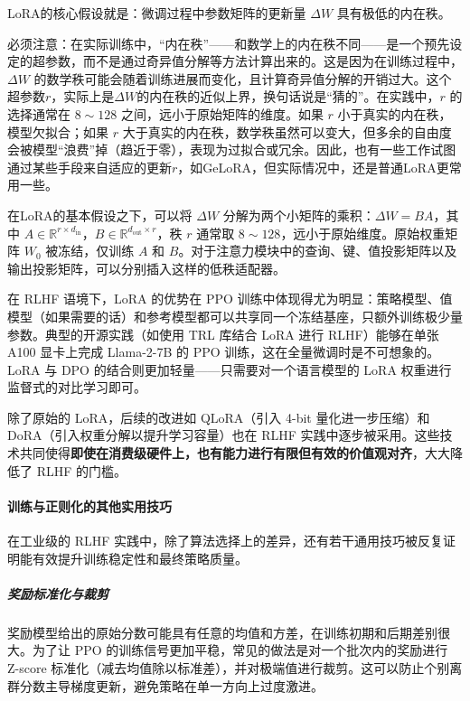 LoRA的核心假设就是：微调过程中参数矩阵的更新量 $\Delta W$ 具有极低的内在秩。

必须注意：在实际训练中，“内在秩”——和数学上的内在秩不同——是一个预先设定的超参数，而不是通过奇异值分解等方法计算出来的。这是因为在训练过程中，$\Delta W$ 的数学秩可能会随着训练进展而变化，且计算奇异值分解的开销过大。这个超参数$r$，实际上是$\Delta W$的内在秩的近似上界，换句话说是“猜的”。在实践中，$r$ 的选择通常在 $8\sim 128$ 之间，远小于原始矩阵的维度。如果 $r$ 小于真实的内在秩，模型欠拟合；如果 $r$ 大于真实的内在秩，数学秩虽然可以变大，但多余的自由度会被模型“浪费”掉（趋近于零），表现为过拟合或冗余。因此，也有一些工作试图通过某些手段来自适应的更新$r$，如GeLoRA\cite{eddib2024gelorageometricadaptiveranks}，但实际情况中，还是普通LoRA更常用一些。

在LoRA的基本假设之下，可以将 $\Delta W$ 分解为两个小矩阵的乘积：$\Delta W = B A$，其中 $A \in \mathbb{R}^{r \times d_\text{in}}$，$B \in \mathbb{R}^{d_\text{out} \times r}$，秩 $r$ 通常取 $8\sim 128$，远小于原始维度。原始权重矩阵 $W_0$ 被冻结，仅训练 $A$ 和 $B$。对于注意力模块中的查询、键、值投影矩阵以及输出投影矩阵，可以分别插入这样的低秩适配器。

在 RLHF 语境下，LoRA 的优势在 PPO 训练中体现得尤为明显：策略模型、值模型（如果需要的话）和参考模型都可以共享同一个冻结基座，只额外训练极少量参数。典型的开源实践（如使用 TRL 库结合 LoRA 进行 RLHF）能够在单张 A100 显卡上完成 Llama-2-7B 的 PPO 训练，这在全量微调时是不可想象的。LoRA 与 DPO 的结合则更加轻量——只需要对一个语言模型的 LoRA 权重进行监督式的对比学习即可。

除了原始的 LoRA，后续的改进如 QLoRA（引入 4-bit 量化进一步压缩）和 DoRA（引入权重分解以提升学习容量）也在 RLHF 实践中逐步被采用\cite{dettmers2023qlora,liu2024dora}。这些技术共同使得\textbf{即使在消费级硬件上，也有能力进行有限但有效的价值观对齐}，大大降低了 RLHF 的门槛。

\paragraph{训练与正则化的其他实用技巧}

在工业级的 RLHF 实践中，除了算法选择上的差异，还有若干通用技巧被反复证明能有效提升训练稳定性和最终策略质量。

\subparagraph{奖励标准化与裁剪} 奖励模型给出的原始分数可能具有任意的均值和方差，在训练初期和后期差别很大。为了让 PPO 的训练信号更加平稳，常见的做法是对一个批次内的奖励进行 Z-score 标准化（减去均值除以标准差），并对极端值进行裁剪。这可以防止个别离群分数主导梯度更新，避免策略在单一方向上过度激进。


